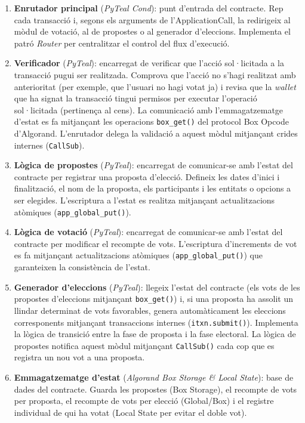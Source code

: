 \begin{enumerate}[label=\roman*.]
    \item \textbf{Enrutador principal} (\textit{PyTeal Cond}): punt d'entrada del contracte. Rep cada transacció i, segons els arguments de l'ApplicationCall, la redirigeix al mòdul de votació, al de propostes o al generador d'eleccions. Implementa el patró \textit{Router} per centralitzar el control del flux d'execució.

    \item \textbf{Verificador} (\textit{PyTeal}): encarregat de verificar que l'acció sol·licitada a la transacció pugui ser realitzada. Comprova que l'acció no s'hagi realitzat amb anterioritat (per exemple, que l'usuari no hagi votat ja) i revisa que la \textit{wallet} que ha signat la transacció tingui permisos per executar l'operació sol·licitada (pertinença al cens). La comunicació amb l'emmagatzematge d'estat es fa mitjançant les operacions \texttt{box\_get()} del protocol Box Opcode d'Algorand. L'enrutador delega la validació a aquest mòdul mitjançant crides internes (\texttt{CallSub}).

    \item \textbf{Lògica de propostes} (\textit{PyTeal}): encarregat de comunicar-se amb l'estat del contracte per registrar una proposta d'elecció. Defineix les dates d'inici i finalització, el nom de la proposta, els participants i les entitats o opcions a ser elegides. L'escriptura a l'estat es realitza mitjançant actualitzacions atòmiques (\texttt{app\_global\_put()}).

    \item \textbf{Lògica de votació} (\textit{PyTeal}): encarregat de comunicar-se amb l'estat del contracte per modificar el recompte de vots. L'escriptura d'increments de vot es fa mitjançant actualitzacions atòmiques (\texttt{app\_global\_put()}) que garanteixen la consistència de l'estat.

    \item \textbf{Generador d'eleccions} (\textit{PyTeal}): llegeix l'estat del contracte (els vots de les propostes d'eleccions mitjançant \texttt{box\_get()}) i, si una proposta ha assolit un llindar determinat de vots favorables, genera automàticament les eleccions corresponents mitjançant transaccions internes (\texttt{itxn.submit()}). Implementa la lògica de transició entre la fase de proposta i la fase electoral. La lògica de propostes notifica aquest mòdul mitjançant \texttt{CallSub()} cada cop que es registra un nou vot a una proposta.

    \item \textbf{Emmagatzematge d'estat} (\textit{Algorand Box Storage \& Local State}): base de dades del contracte. Guarda les propostes (Box Storage), el recompte de vots per proposta, el recompte de vots per elecció (Global/Box) i el registre individual de qui ha votat (Local State per evitar el doble vot).
\end{enumerate}

